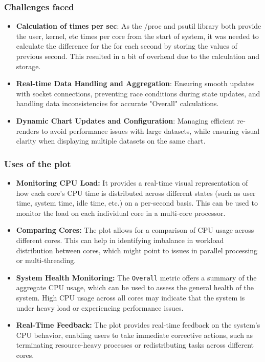 \documentclass[12pt]{article}
\begin{document}
\subsubsection{Challenges faced}
    \begin{itemize}
    \item \textbf{Calculation of times per sec}: As the /proc and psutil library both provide the user, kernel, etc times per core from the start of system, it was needed to calculate the difference for the for each second by storing the values of previous second. This resulted in a bit of overhead due to the calculation and storage.
    \item \textbf{Real-time Data Handling and Aggregation}: Ensuring smooth updates with socket connections, preventing race conditions during state updates, and handling data inconsistencies for accurate "Overall" calculations.
    \item \textbf{Dynamic Chart Updates and Configuration}: Managing efficient re-renders to avoid performance issues with large datasets, while ensuring visual clarity when displaying multiple datasets on the same chart.
\end{itemize}

\subsubsection{Uses of the plot}
\begin{itemize}
    \item \textbf{Monitoring CPU Load:} It provides a real-time visual representation of how each core's CPU time is distributed across different states (such as user time, system time, idle time, etc.) on a per-second basis. This can be used to monitor the load on each individual core in a multi-core processor.
    \item \textbf{Comparing Cores:} The plot allows for a comparison of CPU usage across different cores. This can help in identifying imbalance in workload distribution between cores, which might point to issues in parallel processing or multi-threading.
    \item \textbf{System Health Monitoring:} The \texttt{Overall} metric offers a summary of the aggregate CPU usage, which can be used to assess the general health of the system. High CPU usage across all cores may indicate that the system is under heavy load or experiencing performance issues.
    \item \textbf{Real-Time Feedback:} The plot provides real-time feedback on the system's CPU behavior, enabling users to take immediate corrective actions, such as terminating resource-heavy processes or redistributing tasks across different cores.
\end{itemize}
\end{document}
